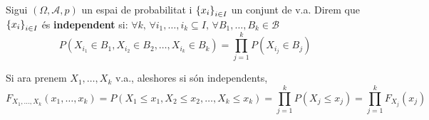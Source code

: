 \begin{defi}
  Sigui $(\Omega, \mathcal{A}, p)$ un espai de probabilitat i $\left\{x_{i}\right\}_{i\in I}$ un conjunt de v.a. Direm que $\left\{x_{i}\right\}_{i\in I}$ és \textbf{independent} si: $\forall k, \, \forall {i_{1}, \ldots, i_{k}} \subseteq I, \, \forall B_{1}, \ldots, B_{k} \in \mathcal{B}$
  \[
    P(X_{i_{1}} \in B_{1}, X_{i_{2}}\in B_{2}, \ldots , X_{i_{k}}\in B_{k}) = \prod\limits_{j=1}^{k}P(X_{i_{j}}\in B_{j})
  \]
  
  Si ara prenem $X_{1}, \ldots, X_{k}$ v.a., aleshores si són independents, 
  \[
    F_{X_{1}, \ldots, X_{k}}(x_{1}, \dots, x_{k}) = P(X_{1} \leq x_{1}, X_{2} \leq x_{2}, \ldots , X_{k} \leq x_{k}) = \prod\limits_{j=1}^{k}P(X_{j} \leq x_{j}) = \prod\limits_{j=1}^{k}F_{X_{j}}(x_{j})
  \]
\end{defi}
